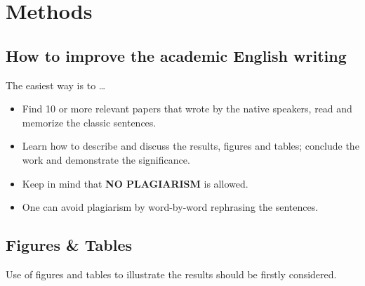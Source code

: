 

%

\section{Methods}
\label{sec:methods}

\subsection{How to improve the academic English writing}

The easiest way is to \ldots

\begin{itemize}
  \item Find 10 or more relevant papers that wrote by the native speakers, read and memorize the classic sentences. 
  \item Learn how to describe and discuss the results, figures and tables; conclude the work and demonstrate the significance.
  \item Keep in mind that \textbf{NO PLAGIARISM} is allowed. 
  \item One can avoid plagiarism by word-by-word rephrasing the sentences. 
\end{itemize}


\subsection{Figures \& Tables}

Use of figures and tables to illustrate the results should be firstly considered. 

